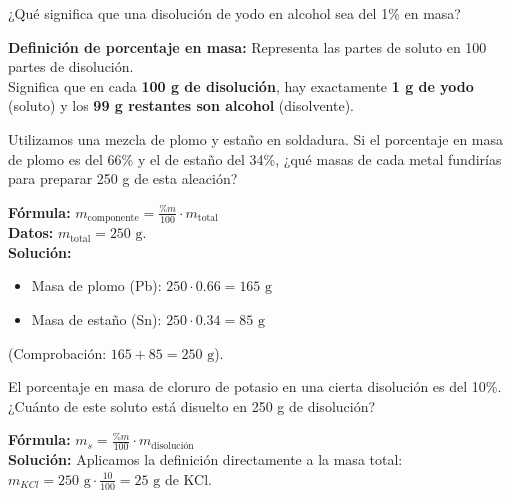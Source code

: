\begin{exercise}
    ¿Qué significa que una disolución de yodo en alcohol sea del 1\% en masa?
    \begin{solu}
        \textbf{Definición de porcentaje en masa:} Representa las partes de soluto en 100 partes de disolución. \\
        Significa que en cada \textbf{100 g de disolución}, hay exactamente \textbf{1 g de yodo} (soluto) y los \textbf{99 g restantes son alcohol} (disolvente).
    \end{solu}
\end{exercise}

\begin{exercise}
    Utilizamos una mezcla de plomo y estaño en soldadura. Si el porcentaje en masa de plomo es del 66\% y el de estaño del 34\%, ¿qué masas de cada metal fundirías para preparar 250 g de esta aleación?
    \begin{solu}
        \textbf{Fórmula:} $m_{\text{componente}} = \frac{\%m}{100} \cdot m_{\text{total}}$ \\

        \textbf{Datos:} $m_{\text{total}} = 250 \text{ g}$. \\

        \textbf{Solución:}
        \begin{itemize}
            \item Masa de plomo (Pb): $250 \cdot 0.66 = 165 \text{ g}$
            \item Masa de estaño (Sn): $250 \cdot 0.34 = 85 \text{ g}$
        \end{itemize}
        (Comprobación: $165 + 85 = 250 \text{ g}$).
    \end{solu}
\end{exercise}


\begin{exercise}
    El porcentaje en masa de cloruro de potasio en una cierta disolución es del 10\%. ¿Cuánto de este soluto está disuelto en 250 g de disolución?
    \begin{solu}
        \textbf{Fórmula:} $m_s = \frac{\%m}{100} \cdot m_{\text{disolución}}$ \\
        \textbf{Solución:} Aplicamos la definición directamente a la masa total: \\
        $m_{KCl} = 250 \text{ g} \cdot \frac{10}{100} = 25 \text{ g}$ de KCl.
    \end{solu}
\end{exercise}

